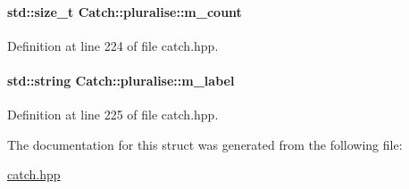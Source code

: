 \paragraph[{m\+\_\+count}]{\setlength{\rightskip}{0pt plus 5cm}std\+::size\+\_\+t Catch\+::pluralise\+::m\+\_\+count}\label{a00064_a4dce2fa13ec6f00fac09b2418265441e}


Definition at line 224 of file catch.\+hpp.

\hypertarget{a00064_a8849cbdd3f11ebe7747597c8644e8793}{}
\paragraph[{m\+\_\+label}]{\setlength{\rightskip}{0pt plus 5cm}std\+::string Catch\+::pluralise\+::m\+\_\+label}\label{a00064_a8849cbdd3f11ebe7747597c8644e8793}


Definition at line 225 of file catch.\+hpp.



The documentation for this struct was generated from the following file\+:\begin{DoxyCompactItemize}
\item 
\hyperlink{a00094}{catch.\+hpp}\end{DoxyCompactItemize}
